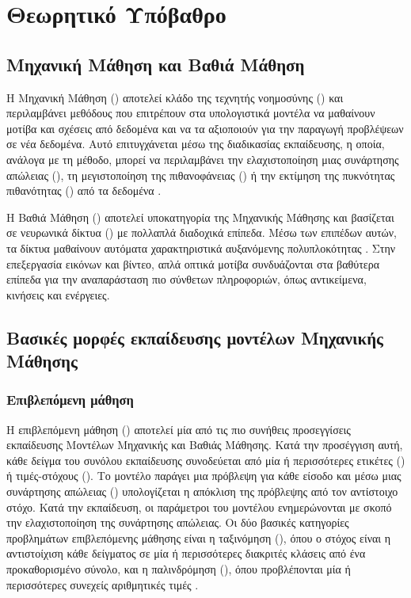 \chapter{Θεωρητικό Υπόβαθρο}
\label{ch:theory}

\section{Μηχανική Μάθηση και Βαθιά Μάθηση}
\label{sec:machine-deep-learning}

Η Μηχανική Μάθηση () αποτελεί κλάδο της τεχνητής
νοημοσύνης () και περιλαμβάνει μεθόδους που επιτρέπουν στα υπολογιστικά μοντέλα
να μαθαίνουν μοτίβα και σχέσεις από δεδομένα και να τα αξιοποιούν για την
παραγωγή προβλέψεων σε νέα δεδομένα. Αυτό επιτυγχάνεται μέσω της διαδικασίας εκπαίδευσης, η οποία, ανάλογα
με τη μέθοδο, μπορεί να περιλαμβάνει την ελαχιστοποίηση μιας συνάρτησης
απώλειας (), τη μεγιστοποίηση της πιθανοφάνειας
() ή την εκτίμηση της πυκνότητας
πιθανότητας () από τα δεδομένα
\cite{bishop2006pattern}.

Η Βαθιά Μάθηση () αποτελεί υποκατηγορία της Mηχανικής
Mάθησης και βασίζεται σε νευρωνικά δίκτυα () με πολλαπλά διαδοχικά επίπεδα.
Μέσω των επιπέδων αυτών, τα δίκτυα μαθαίνουν αυτόματα χαρακτηριστικά
αυξανόμενης πολυπλοκότητας \cite{goodfellow2016deep}. Στην επεξεργασία εικόνων και βίντεο, απλά
οπτικά μοτίβα συνδυάζονται στα βαθύτερα επίπεδα για την αναπαράσταση πιο
σύνθετων πληροφοριών, όπως αντικείμενα, κινήσεις και ενέργειες.

\section{Βασικές μορφές εκπαίδευσης μοντέλων Μηχανικής Μάθησης}
\label{sec:learning-paradigms}

\subsection{Επιβλεπόμενη μάθηση}
\label{subsec:supervised-learning}

Η επιβλεπόμενη μάθηση () αποτελεί μία από τις πιο συνήθεις
προσεγγίσεις εκπαίδευσης Μοντέλων Μηχανικής και Βαθιάς Μάθησης.
Κατά την προσέγγιση αυτή, κάθε δείγμα του συνόλου εκπαίδευσης συνοδεύεται από μία ή περισσότερες
ετικέτες () ή τιμές-στόχους (). Το μοντέλο παράγει μια πρόβλεψη για κάθε είσοδο και
μέσω μιας συνάρτησης απώλειας () υπολογίζεται η απόκλιση της πρόβλεψης
από τον αντίστοιχο στόχο. Κατά την εκπαίδευση, οι παράμετροι του μοντέλου ενημερώνονται με σκοπό την
ελαχιστοποίηση της συνάρτησης απώλειας. Οι δύο βασικές κατηγορίες προβλημάτων επιβλεπόμενης μάθησης είναι η
ταξινόμηση (), όπου ο στόχος είναι η αντιστοίχιση κάθε
δείγματος σε μία ή περισσότερες διακριτές κλάσεις από ένα προκαθορισμένο
σύνολο, και η παλινδρόμηση (), όπου προβλέπονται μία ή
περισσότερες συνεχείς αριθμητικές τιμές \cite{bishop2006pattern}.

